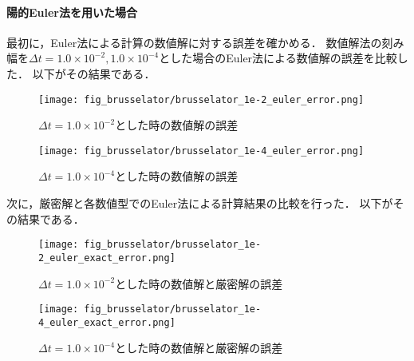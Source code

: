 \paragraph*{陽的Euler法を用いた場合}
最初に，Euler法による計算の数値解に対する誤差を確かめる．
数値解法の刻み幅を$\Delta t = 1.0 \times 10^{-2},1.0 \times 10^{-4}$とした場合のEuler法による数値解の誤差を比較した．
以下がその結果である．
\begin{figure}[H]
    \centering
    \begin{minipage}[b]{0.49\columnwidth}
        \centering
        \texttt{[image: fig\_brusselator/brusselator\_1e-2\_euler\_error.png]}
        \caption{$\Delta t = 1.0 \times 10^{-2}$とした時の数値解の誤差}
        \label{fig:brusselator_1e-2_euler_error}
    \end{minipage}
    \begin{minipage}[b]{0.49\columnwidth}
        \centering
        \texttt{[image: fig\_brusselator/brusselator\_1e-4\_euler\_error.png]}
        \caption{$\Delta t = 1.0 \times 10^{-4}$とした時の数値解の誤差}
        \label{fig:brusselator_1e-4_euler_error}
    \end{minipage}
\end{figure}

次に，厳密解と各数値型でのEuler法による計算結果の比較を行った．
以下がその結果である．\\
\begin{figure}[H]
    \centering
    \begin{minipage}[b]{0.49\columnwidth}
        \centering
        \texttt{[image: fig\_brusselator/brusselator\_1e-2\_euler\_exact\_error.png]}
        \caption{$\Delta t = 1.0 \times 10^{-2}$とした時の数値解と厳密解の誤差}
        \label{fig:brusselator_1e-2_euler_exact_error}
    \end{minipage}
    \begin{minipage}[b]{0.49\columnwidth}
        \centering
        \texttt{[image: fig\_brusselator/brusselator\_1e-4\_euler\_exact\_error.png]}
        \caption{$\Delta t = 1.0 \times 10^{-4}$とした時の数値解と厳密解の誤差}
        \label{fig:brusselator_1e-4_euler_exact_error}
    \end{minipage}
\end{figure}



